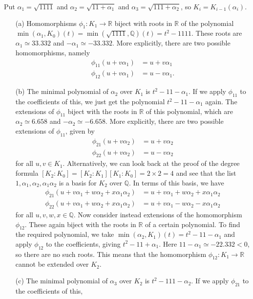 \documentclass{amsart}
\newcommand{\Q}         {{\mathbb{Q}}}
\newcommand{\R}         {{\mathbb{R}}}
\newcommand{\al}        {\alpha}
\newcommand{\tm}        {\times}
\renewcommand{\:}{\colon}
\newenvironment{solution}{\SolutionInline}{\endSolutionInline}
\theoremstyle{definition}
\renewenvironment{solution}{\SolutionAtEnd}{\endSolutionAtEnd}
\begin{document}
\begin{solution}
 Put $\al_1=\sqrt{1111}$ and $\al_2=\sqrt{11+\al_1}$ and
 $\al_3=\sqrt{111+\al_2}$, so $K_i=K_{i-1}(\al_i)$.
 \begin{itemize}
  \item[(a)] Homomorphisms $\phi_1\:K_1\to\R$ biject with roots in
   $\R$ of the polynomial
   $\min(\al_1,K_0)(t)=\min(\sqrt{1111},\Q)(t)=t^2-1111$.  These roots
   are $\al_1\simeq 33.332$ and $-\al_1\simeq -33.332$.  More
   explicitly, there are two possible homomorphisms, namely
   \begin{align*}
    \phi_{11}(u+v\al_1) &= u+v\al_1 \\
    \phi_{12}(u+v\al_1) &= u-v\al_1.
   \end{align*}
  \item[(b)] The minimal polynomial of $\al_2$ over $K_1$ is
   $t^2-11-\al_1$.  If we apply $\phi_{11}$ to the coefficients of this,
   we just get the polynomial $t^2-11-\al_1$ again.  The extensions of
   $\phi_{11}$ biject with the roots in $\R$ of this polynomial, which
   are $\al_2\simeq 6.658$ and $-\al_2\simeq -6.658$.  More
   explicitly, there are two possible extensions of $\phi_{11}$,
   given by
   \begin{align*}
    \phi_{21}(u+v\al_2) &= u+v\al_2 \\
    \phi_{22}(u+v\al_2) &= u-v\al_2
   \end{align*}
   for all $u,v\in K_1$.  Alternatively, we can look back at the proof
   of the degree formula $[K_2:K_0]=[K_2:K_1][K_1:K_0]=2\tm 2=4$ and
   see that the list $1,\al_1,\al_2,\al_1\al_2$ is a basis for $K_2$
   over $\Q$.  In terms of this basis, we have 
   \begin{align*}
    \phi_{21}(u+v\al_1+w\al_2+x\al_1\al_2) &= u+v\al_1+w\al_2+x\al_1\al_2 \\
    \phi_{22}(u+v\al_1+w\al_2+x\al_1\al_2) &= u+v\al_1-w\al_2-x\al_1\al_2
   \end{align*}
   for all $u,v,w,x\in\Q$.  Now consider instead extensions of the
   homomorphism $\phi_{12}$.  These again biject with the roots in
   $\R$ of a certain polynomial.  To find the required polynomial, we
   take $\min(\al_2,K_1)(t)=t^2-11-\al_1$ and apply $\phi_{12}$ to the
   coefficients, giving $t^2-11+\al_1$.  Here $11-\al_1\simeq
   -22.332<0$, so there are no such roots.  This means that
   the homomorphism $\phi_{12}\:K_1\to\R$ cannot be extended over
   $K_2$.  
  \item[(c)] The minimal polynomial of $\al_3$ over $K_2$ is
   $t^2-111-\al_2$.  If we apply $\phi_{21}$ to the coefficients of this,

\end{itemize}
\end{solution}
\end{document}
